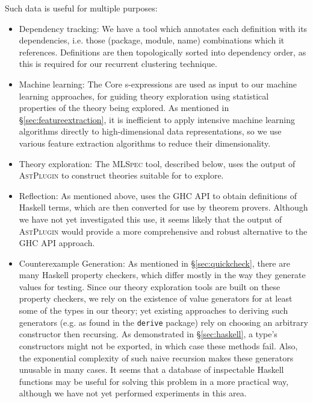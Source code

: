 Such data is useful for multiple purposes:

\begin{itemize}
  \item{Dependency tracking}: We have a tool which annotates each definition with its dependencies, i.e. those (package, module, name) combinations which it references. Definitions are then topologically sorted into dependency order, as this is required for our recurrent clustering technique.

  \item{Machine learning}: The Core s-expressions are used as input to our machine learning approaches, for guiding theory exploration using statistical properties of the theory being explored. As mentioned in \S \ref{sec:featureextraction}, it is inefficient to apply intensive machine learning algorithms directly to high-dimensional data representations, so we use various feature extraction algorithms to reduce their dimensionality.

  \item{Theory exploration}: The \textsc{MLSpec} tool, described below, uses the output of \textsc{AstPlugin} to construct theories suitable for \qspec{} to explore.

  \item{Reflection}: As mentioned above, \hspec{} uses the GHC API to obtain definitions of Haskell terms, which are then converted for use by theorem provers. Although we have not yet investigated this use, it seems likely that the output of \textsc{AstPlugin} would provide a more comprehensive and robust alternative to the GHC API approach.

  \item{Counterexample Generation}: As mentioned in \S \ref{sec:quickcheck}, there are many Haskell property checkers, which differ mostly in the way they generate values for testing. Since our theory exploration tools are built on these property checkers, we rely on the existence of value generators for at least some of the types in our theory; yet existing approaches to deriving such generators (e.g. as found in the \texttt{derive} package) rely on choosing an arbitrary constructor then recursing. As demonstrated in \S \ref{sec:haskell}, a type's constructors might not be exported, in which case these methods fail. Also, the exponential complexity of such naive recursion makes these generators unusable in many cases. It seems that a database of inspectable Haskell functions may be useful for solving this problem in a more practical way, although we have not yet performed experiments in this area.
\end{itemize}


